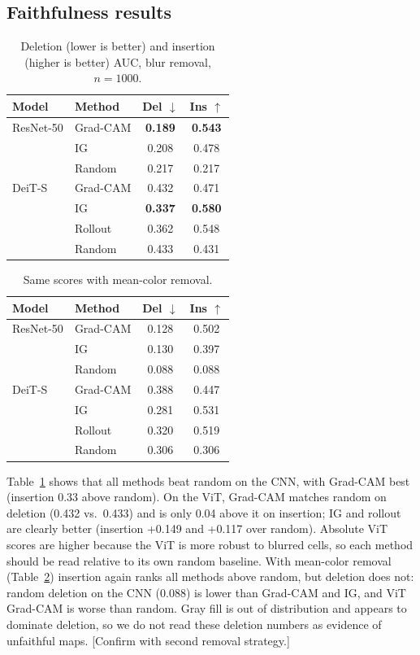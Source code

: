 \documentclass[10pt,twocolumn]{article}
\newcommand{\todo}[1]{{\color{red}[#1]}}
\begin{document}
\subsection{Faithfulness results}
\begin{table}[t]
\centering\small
\caption{Deletion (lower is better) and insertion (higher is better) AUC, blur removal, $n{=}1000$.}\label{tab:blur}
\begin{tabular}{llcc}
\toprule
Model & Method & Del $\downarrow$ & Ins $\uparrow$\\
\midrule
ResNet-50 & Grad-CAM & \textbf{0.189} & \textbf{0.543}\\
 & IG & 0.208 & 0.478\\
 & Random & 0.217 & 0.217\\
\midrule
DeiT-S & Grad-CAM & 0.432 & 0.471\\
 & IG & \textbf{0.337} & \textbf{0.580}\\
 & Rollout & 0.362 & 0.548\\
 & Random & 0.433 & 0.431\\
\bottomrule
\end{tabular}
\end{table}

\begin{table}[t]
\centering\small
\caption{Same scores with mean-color removal.}\label{tab:mean}
\begin{tabular}{llcc}
\toprule
Model & Method & Del $\downarrow$ & Ins $\uparrow$\\
\midrule
ResNet-50 & Grad-CAM & 0.128 & 0.502\\
 & IG & 0.130 & 0.397\\
 & Random & 0.088 & 0.088\\
\midrule
DeiT-S & Grad-CAM & 0.388 & 0.447\\
 & IG & 0.281 & 0.531\\
 & Rollout & 0.320 & 0.519\\
 & Random & 0.306 & 0.306\\
\bottomrule
\end{tabular}
\end{table}

Table~\ref{tab:blur} shows that all methods beat random on the CNN, with Grad-CAM best (insertion 0.33 above random). On the ViT, Grad-CAM matches random on deletion (0.432 vs.\ 0.433) and is only 0.04 above it on insertion; IG and rollout are clearly better (insertion +0.149 and +0.117 over random). Absolute ViT scores are higher because the ViT is more robust to blurred cells, so each method should be read relative to its own random baseline. With mean-color removal (Table~\ref{tab:mean}) insertion again ranks all methods above random, but deletion does not: random deletion on the CNN (0.088) is lower than Grad-CAM and IG, and ViT Grad-CAM is worse than random. Gray fill is out of distribution and appears to dominate deletion, so we do not read these deletion numbers as evidence of unfaithful maps. \todo{Confirm with second removal strategy.}
\end{document}
